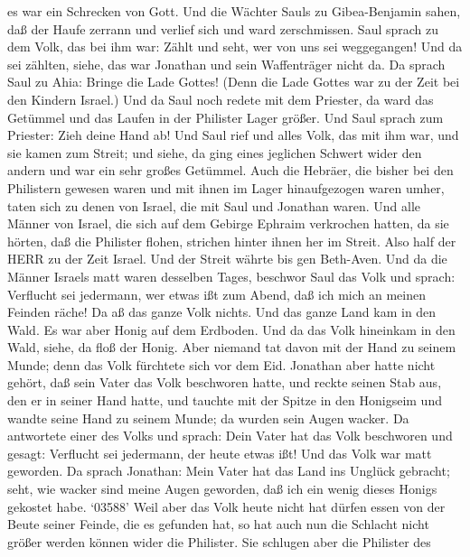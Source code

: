 es war ein Schrecken von Gott.  Und die Wächter Sauls zu
Gibea-Benjamin sahen, daß der Haufe zerrann und verlief sich und ward
zerschmissen.  Saul sprach zu dem Volk, das bei ihm war:
Zählt und seht, wer von uns sei weggegangen! Und da sei zählten, siehe,
das war Jonathan und sein Waffenträger nicht da.  Da sprach
Saul zu Ahia: Bringe die Lade Gottes! (Denn die Lade Gottes war zu der
Zeit bei den Kindern Israel.)  Und da Saul noch redete mit
dem Priester, da ward das Getümmel und das Laufen in der Philister Lager
größer. Und Saul sprach zum Priester: Zieh deine Hand ab! 
Und Saul rief und alles Volk, das mit ihm war, und sie kamen zum Streit;
und siehe, da ging eines jeglichen Schwert wider den andern und war ein
sehr großes Getümmel.  Auch die Hebräer, die bisher bei den
Philistern gewesen waren und mit ihnen im Lager hinaufgezogen waren
umher, taten sich zu denen von Israel, die mit Saul und Jonathan waren.
 Und alle Männer von Israel, die sich auf dem Gebirge
Ephraim verkrochen hatten, da sie hörten, daß die Philister flohen,
strichen hinter ihnen her im Streit.  Also half der HERR zu
der Zeit Israel. Und der Streit währte bis gen Beth-Aven. 
Und da die Männer Israels matt waren desselben Tages, beschwor Saul das
Volk und sprach: Verflucht sei jedermann, wer etwas ißt zum Abend, daß
ich mich an meinen Feinden räche! Da aß das ganze Volk nichts.
 Und das ganze Land kam in den Wald. Es war aber Honig auf
dem Erdboden.  Und da das Volk hineinkam in den Wald,
siehe, da floß der Honig. Aber niemand tat davon mit der Hand zu seinem
Munde; denn das Volk fürchtete sich vor dem Eid.  Jonathan
aber hatte nicht gehört, daß sein Vater das Volk beschworen hatte, und
reckte seinen Stab aus, den er in seiner Hand hatte, und tauchte mit der
Spitze in den Honigseim und wandte seine Hand zu seinem Munde; da wurden
sein Augen wacker.  Da antwortete einer des Volks und
sprach: Dein Vater hat das Volk beschworen und gesagt: Verflucht sei
jedermann, der heute etwas ißt! Und das Volk war matt geworden.
 Da sprach Jonathan: Mein Vater hat das Land ins Unglück
gebracht; seht, wie wacker sind meine Augen geworden, daß ich ein wenig
dieses Honigs gekostet habe.  `03588' Weil aber das Volk
heute nicht hat dürfen essen von der Beute seiner Feinde, die es
gefunden hat, so hat auch nun die Schlacht nicht größer werden können
wider die Philister.  Sie schlugen aber die Philister des
